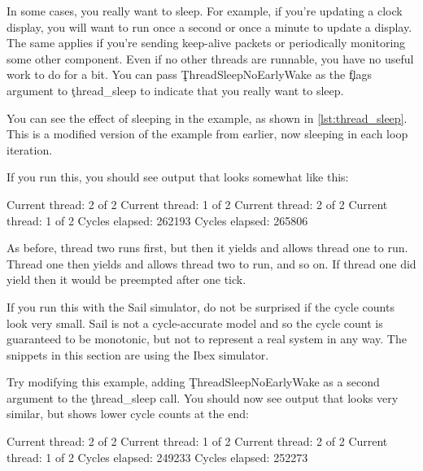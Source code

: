 In some cases, you really want to sleep.
For example, if you're updating a clock display, you will want to run once a second or once a minute to update a display.
The same applies if you're sending keep-alive packets or periodically monitoring some other component.
Even if no other threads are runnable, you have no useful work to do for a bit.
You can pass \c{ThreadSleepNoEarlyWake} as the \c{flags} argument to \c{thread_sleep} to indicate that you really want to sleep.

You can see the effect of sleeping in the  example, as shown in \ref{lst:thread_sleep}.
This is a modified version of the  example from earlier, now sleeping in each loop iteration.

\codelisting[filename=examples/thread_sleep/current.cc,marker=entry,label=lst:thread_sleep,caption="A simple example of thread sleeping"]{}

If you run this, you should see output that looks somewhat like this:

\begin{console}
Current thread: 2 of 2
Current thread: 1 of 2
Current thread: 2 of 2
Current thread: 1 of 2
Cycles elapsed: 262193
Cycles elapsed: 265806
\end{console}

As before, thread two runs first, but then it yields and allows thread one to run.
Thread one then yields and allows thread two to run, and so on.
If thread one did  yield then it would be preempted after one tick.

\begin{note}
If you run this with the Sail simulator, do not be surprised if the cycle counts look very small.
Sail is not a cycle-accurate model and so the cycle count is guaranteed to be monotonic, but not to represent a real system in any way.
The snippets in this section are using the Ibex simulator.
\end{note}

Try modifying this example, adding \c{ThreadSleepNoEarlyWake}  as a second argument to the \c{thread_sleep} call.
You should now see output that looks very similar, but shows lower cycle counts at the end:

\begin{console}
Current thread: 2 of 2
Current thread: 1 of 2
Current thread: 2 of 2
Current thread: 1 of 2
Cycles elapsed: 249233
Cycles elapsed: 252273
\end{console}

